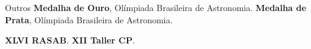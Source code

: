 \begin{rubric}{Outros}
\entry*[2022] \textbf{Medalha de Ouro}, Olímpiada Brasileira de Astronomia.
%
\entry*[2021] \textbf{Medalha de Prata}, Olímpiada Brasileira de Astronomia.

\entry*[2023] \textbf{XLVI RASAB}.
\entry*[2024] \textbf{XII Taller CP}.

\end{rubric}